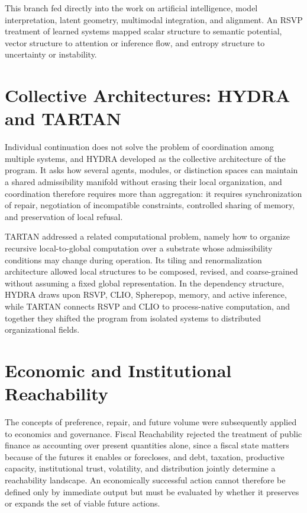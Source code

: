 \documentclass[11pt,oneside]{book}
\numberwithin{equation}{chapter}
\theoremstyle{definition}
\theoremstyle{plain}
\begin{document}
This branch fed directly into the work on artificial intelligence, model interpretation, latent geometry, multimodal integration, and alignment. An RSVP treatment of learned systems mapped scalar structure to semantic potential, vector structure to attention or inference flow, and entropy structure to uncertainty or instability.

\section{Collective Architectures: HYDRA and TARTAN}

Individual continuation does not solve the problem of coordination among multiple systems, and HYDRA developed as the collective architecture of the program. It asks how several agents, modules, or distinction spaces can maintain a shared admissibility manifold without erasing their local organization, and coordination therefore requires more than aggregation: it requires synchronization of repair, negotiation of incompatible constraints, controlled sharing of memory, and preservation of local refusal.

TARTAN addressed a related computational problem, namely how to organize recursive local-to-global computation over a substrate whose admissibility conditions may change during operation. Its tiling and renormalization architecture allowed local structures to be composed, revised, and coarse-grained without assuming a fixed global representation. In the dependency structure, HYDRA draws upon RSVP, CLIO, Spherepop, memory, and active inference, while TARTAN connects RSVP and CLIO to process-native computation, and together they shifted the program from isolated systems to distributed organizational fields.

\section{Economic and Institutional Reachability}

The concepts of preference, repair, and future volume were subsequently applied to economics and governance. Fiscal Reachability rejected the treatment of public finance as accounting over present quantities alone, since a fiscal state matters because of the futures it enables or forecloses, and debt, taxation, productive capacity, institutional trust, volatility, and distribution jointly determine a reachability landscape. An economically successful action cannot therefore be defined only by immediate output but must be evaluated by whether it preserves or expands the set of viable future actions.
\end{document}
